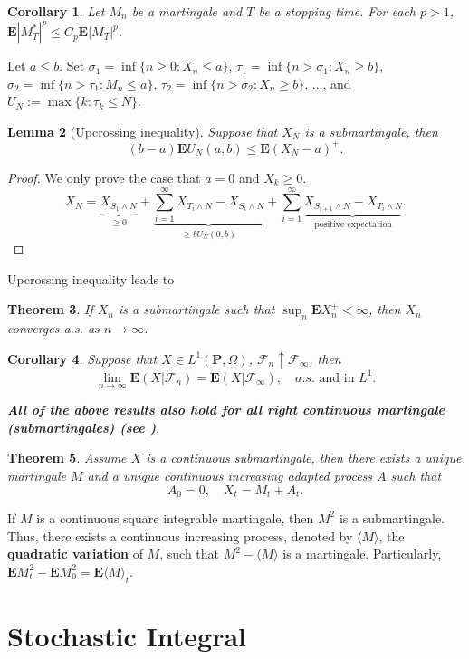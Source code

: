 \documentclass[twoside, 12pt]{book}
\numberwithin{equation}{chapter}
\newtheorem{theorem}{Theorem}[section]
\newtheorem{lemma}[theorem]{Lemma}
\newtheorem{corollary}[theorem]{Corollary}
\def\cF{{\mathcal F}}
\def\bE{{\mathbf E}}
\def\bP{{\mathbf P}}
\def\geq{\geqslant}
\def\leq{\leqslant}
\begin{document}
	\begin{corollary}\label{Cor-Lp}
		Let $M_n$ be a martingale and $T$ be a stopping time. For each $p>1$, $\bE |M_T^*|^p \leq C_p \bE |M_T|^p$. 
	\end{corollary}
	
	 Let $a\leq b$. Set $\sigma_1=\inf\{n\geq 0: X_n\leq a\}$, $\tau_1= \inf\{n>\sigma_1: X_n\geq b\}$, $\sigma_2=\inf\{n>\tau_1: M_n\leq a\}$, $\tau_2= \inf\{n>\sigma_2: X_n\geq b\}$, $\dots$, and 
	$U_N:= \max\{k: \tau_k\leq N\}$. 
	\begin{lemma}[Upcrossing inequality]
		Suppose that $X_N$ is a submartingale, then 
		\[
		(b-a)\bE U_N(a,b) \leq \bE (X_{N}-a)^+. 
		\]
	\end{lemma}
	\begin{proof}
		We only prove the case that $a=0$ and $X_k\geq 0$. 
		\[
		X_N=\underbrace{X_{S_1\wedge N}}_{\geq 0}+\underbrace{\sum_{i=1}^\infty X_{T_i\wedge N}-X_{S_i\wedge N}}_{\geq bU_N(0,b)}+ \sum_{i=1}^\infty \underbrace{X_{S_{i+1}\wedge N}-X_{T_i\wedge N}}_{\mbox{positive expectation}}. 
		\] 
	\end{proof}
	Upcrossing inequality leads to 
	\begin{theorem}
		If $X_n$ is a submartingale such that $\sup_{n} \bE X_n^{+}<\infty$, then $X_n$ converges a.s. as $n\to \infty$. 
	\end{theorem}
	\begin{corollary}\label{Cor-convergence}
		Suppose that $X\in L^1(\bP, \Omega)$, $\cF_n\uparrow \cF_\infty$, then 
		\[
		\lim_{n\to\infty}\bE (X|\cF_n) = \bE (X|\cF_\infty),\quad a.s. \mbox{ and in } L^1. 
		\]
	\end{corollary}
	
	
	{\bf {\em All of the above results also hold for all right continuous martingale (submartingales) (see \cite{Huang})}}. 
	
	\begin{theorem}
	Assume $X$ is a continuous submartingale, then there exists a unique martingale $M$ and a unique continuous increasing adapted process $A$ such that 
	\[
	A_0=0, \quad X_t= M_t+A_t. 
	\]
	\end{theorem}
	If $M$ is a continuous square integrable martingale, then $M^2$ is a submartingale. Thus, there exists a continuous increasing process, denoted by $\langle M\rangle$, the {\bf quadratic variation} of $M$, such that $M^2-\langle M\rangle$ is a martingale. Particularly, $\bE M_t^2 - \bE M_0^2 = \bE \langle M \rangle_t$. 
	 
	
	\section{Stochastic Integral}
	
\end{document}
